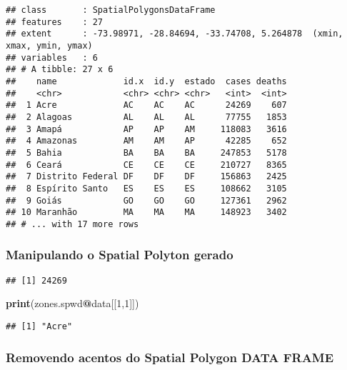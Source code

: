 \documentclass[
]{article}
\newenvironment{Shaded}{\begin{snugshade}}{\end{snugshade}}
\newcommand{\DecValTok}[1]{\textcolor[rgb]{0.00,0.00,0.81}{#1}}
\newcommand{\KeywordTok}[1]{\textcolor[rgb]{0.13,0.29,0.53}{\textbf{#1}}}
\newcommand{\NormalTok}[1]{#1}
\newcommand{\OperatorTok}[1]{\textcolor[rgb]{0.81,0.36,0.00}{\textbf{#1}}}
\begin{document}
\begin{verbatim}
## class       : SpatialPolygonsDataFrame 
## features    : 27 
## extent      : -73.98971, -28.84694, -33.74708, 5.264878  (xmin, xmax, ymin, ymax)
## variables   : 6
## # A tibble: 27 x 6
##    name             id.x  id.y  estado  cases deaths
##    <chr>            <chr> <chr> <chr>   <int>  <int>
##  1 Acre             AC    AC    AC      24269    607
##  2 Alagoas          AL    AL    AL      77755   1853
##  3 Amapá            AP    AP    AM     118083   3616
##  4 Amazonas         AM    AM    AP      42285    652
##  5 Bahia            BA    BA    BA     247853   5178
##  6 Ceará            CE    CE    CE     210727   8365
##  7 Distrito Federal DF    DF    DF     156863   2425
##  8 Espírito Santo   ES    ES    ES     108662   3105
##  9 Goiás            GO    GO    GO     127361   2962
## 10 Maranhão         MA    MA    MA     148923   3402
## # ... with 17 more rows
\end{verbatim}

\hypertarget{manipulando-o-spatial-polyton-gerado}{%
\subsubsection{Manipulando o Spatial Polyton
gerado}\label{manipulando-o-spatial-polyton-gerado}}

\begin{Shaded}
\end{Shaded}

\begin{verbatim}
## [1] 24269
\end{verbatim}

\begin{Shaded}
\begin{Highlighting}[]
\KeywordTok{print}\NormalTok{(zones.spwd}\OperatorTok{@}\NormalTok{data[[}\DecValTok{1}\NormalTok{,}\DecValTok{1}\NormalTok{]])}
\end{Highlighting}
\end{Shaded}

\begin{verbatim}
## [1] "Acre"
\end{verbatim}

\hypertarget{removendo-acentos-do-spatial-polygon-data-frame}{%
\subsubsection{Removendo acentos do Spatial Polygon DATA
FRAME}\label{removendo-acentos-do-spatial-polygon-data-frame}}
\end{document}
